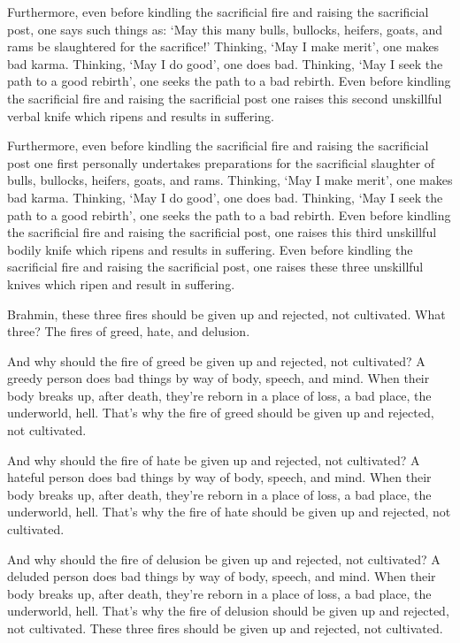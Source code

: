 \documentclass[12pt,openany]{book}%
\begin{document}
Furthermore, even before kindling the sacrificial fire and raising the sacrificial post, one says such things as: ‘May this many bulls, bullocks, heifers, goats, and rams be slaughtered for the sacrifice!’ Thinking, ‘May I make merit’, one makes bad karma. Thinking, ‘May I do good’, one does bad. Thinking, ‘May I seek the path to a good rebirth’, one seeks the path to a bad rebirth. Even before kindling the sacrificial fire and raising the sacrificial post one raises this second unskillful verbal knife which ripens and results in suffering. 

Furthermore, even before kindling the sacrificial fire and raising the sacrificial post one first personally undertakes preparations for the sacrificial slaughter of bulls, bullocks, heifers, goats, and rams. Thinking, ‘May I make merit’, one makes bad karma. Thinking, ‘May I do good’, one does bad. Thinking, ‘May I seek the path to a good rebirth’, one seeks the path to a bad rebirth. Even before kindling the sacrificial fire and raising the sacrificial post, one raises this third unskillful bodily knife which ripens and results in suffering. Even before kindling the sacrificial fire and raising the sacrificial post, one raises these three unskillful knives which ripen and result in suffering. 

Brahmin, these three fires should be given up and rejected, not cultivated. What three? The fires of greed, hate, and delusion. 

And why should the fire of greed be given up and rejected, not cultivated? A greedy person does bad things by way of body, speech, and mind. When their body breaks up, after death, they’re reborn in a place of loss, a bad place, the underworld, hell. That’s why the fire of greed should be given up and rejected, not cultivated. 

And why should the fire of hate be given up and rejected, not cultivated? A hateful person does bad things by way of body, speech, and mind. When their body breaks up, after death, they’re reborn in a place of loss, a bad place, the underworld, hell. That’s why the fire of hate should be given up and rejected, not cultivated. 

And why should the fire of delusion be given up and rejected, not cultivated? A deluded person does bad things by way of body, speech, and mind. When their body breaks up, after death, they’re reborn in a place of loss, a bad place, the underworld, hell. That’s why the fire of delusion should be given up and rejected, not cultivated. These three fires should be given up and rejected, not cultivated. 
\end{document}
